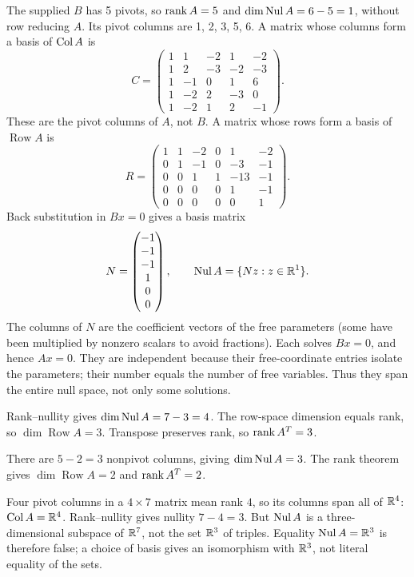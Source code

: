 The supplied $B$ has 5 pivots, so $\operatorname{rank} A=5$ and $\dim\operatorname{Nul} A=6-5=1$, without row reducing $A$. Its pivot columns are 1, 2, 3, 5, 6.
A matrix whose columns form a basis of $\operatorname{Col} A$ is
\[ C=\begin{pmatrix}1&1&-2&1&-2\\1&2&-3&-2&-3\\1&-1&0&1&6\\1&-2&2&-3&0\\1&-2&1&2&-1\end{pmatrix}.\]
These are the pivot columns of $A$, not $B$. A matrix whose rows form a basis of $\operatorname{Row}A$ is
\[ R=\begin{pmatrix}1&1&-2&0&1&-2\\0&1&-1&0&-3&-1\\0&0&1&1&-13&-1\\0&0&0&0&1&-1\\0&0&0&0&0&1\end{pmatrix}.\]
Back substitution in $Bx=0$ gives a basis matrix
\[ N=\begin{pmatrix}-1\\-1\\-1\\1\\0\\0\end{pmatrix},\qquad\operatorname{Nul} A=\{Nz:z\in\mathbb{R}^{1}\}.\]
The columns of $N$ are the coefficient vectors of the free parameters (some have been multiplied by nonzero scalars to avoid fractions). Each solves $Bx=0$, and hence $Ax=0$. They are independent because their free-coordinate entries isolate the parameters; their number equals the number of free variables. Thus they span the entire null space, not only some solutions.

Rank--nullity gives $\dim\operatorname{Nul} A=7-3=4$. The row-space dimension equals
rank, so $\dim\operatorname{Row}A=3$. Transpose preserves rank, so $\operatorname{rank} A^T=3$.

There are $5-2=3$ nonpivot columns, giving $\dim\operatorname{Nul} A=3$.
The rank theorem gives $\dim\operatorname{Row}A=2$ and $\operatorname{rank} A^T=2$.

Four pivot columns in a $4\times7$ matrix mean rank $4$, so its columns span
all of $\mathbb{R}^4$: $\operatorname{Col} A=\mathbb{R}^4$. Rank--nullity gives nullity $7-4=3$.
But $\operatorname{Nul} A$ is a three-dimensional subspace of $\mathbb{R}^7$, not the set
$\mathbb{R}^3$ of triples. Equality $\operatorname{Nul} A=\mathbb{R}^3$ is therefore false; a choice of
basis gives an isomorphism with $\mathbb{R}^3$, not literal equality of the sets.

